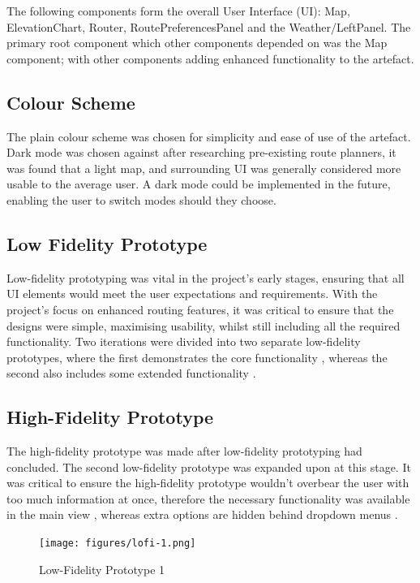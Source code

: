 The following components form the overall User Interface (UI): Map,  ElevationChart, Router, RoutePreferencesPanel and the Weather/LeftPanel. The primary root component which other components depended on was the Map component; with other components adding enhanced functionality to the artefact.

\subsection{Colour Scheme}
\label{ui:colourscheme}

The plain colour scheme was chosen for simplicity and ease of use of the artefact. Dark mode was chosen against after researching pre-existing route planners, it was found that a light map, and surrounding UI was generally considered more usable to the average user. A dark mode could be implemented in the future, enabling the user to switch modes should they choose.

\subsection{Low Fidelity Prototype}
\label{ui:low-fi}

Low-fidelity prototyping was vital in the project's early stages, ensuring that all UI elements would meet the user expectations and requirements. With the project's focus on enhanced routing features, it was critical to ensure that the designs were simple, maximising usability, whilst still including all the required functionality. Two iterations were divided into two separate low-fidelity prototypes, where the first demonstrates the core functionality , whereas the second also includes some extended functionality .

\subsection{High-Fidelity Prototype}
\label{ui:hi-fi}

The high-fidelity prototype was made after low-fidelity prototyping had concluded. The second low-fidelity prototype was expanded upon at this stage. It was critical to ensure the high-fidelity prototype wouldn't overbear the user with too much information at once, therefore the necessary functionality was available in the main view , whereas extra options are hidden behind dropdown menus .

  \begin{figure}[!ht]
    \centering
    \texttt{[image: figures/lofi-1.png]}
    \caption{Low-Fidelity Prototype 1}
    \label{fig:lofi1}
  \end{figure}

